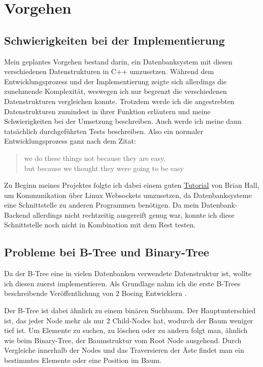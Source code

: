 \documentclass[11pt,a4paper]{article}
\begin{document}
\section{Vorgehen}

\subsection{Schwierigkeiten bei der Implementierung}

Mein geplantes Vorgehen bestand darin, ein Datenbanksystem mit diesen
verschiedenen Datenstrukturen in C++ umzusetzen.
Während dem Entwicklungsprozess und der Implementierung zeigte sich allerdings die
zunehmende Komplexität, weswegen ich nur begrenzt die verschiedenen Datenstrukturen
vergleichen konnte. Trotzdem werde ich die angestrebten Datenstrukturen
zumindest in ihrer Funktion erläutern und meine Schwierigkeiten bei der Umsetzung
beschreiben.
Auch werde ich meine dann tatsächlich durchgeführten Tests beschreiben.
Also ein normaler Entwicklungsprozess ganz nach dem Zitat:

\begin{quote}
    \guillemetright we do these things not because they are easy, \\
    \hspace*{0.2em} but because we thought they were going to be easy\guillemetleft
\end{quote}

Zu Beginn meines Projektes folgte ich dabei einem guten
\href{https://beej.us/guide/bgnet/html/}{Tutorial}
von Brian Hall, um Kommunikation über Linux Websockets umzusetzen, da Datenbanksysteme
eine Schnittstelle zu anderen Programmen benötigen.
Da mein Datenbank-Backend allerdings nicht rechtzeitig ausgereift genug war, konnte
ich diese Schnittstelle noch nicht in Kombination mit dem Rest testen.

\subsection{Probleme bei B-Tree und Binary-Tree}

Da der B-Tree eine in vielen Datenbanken verwendete Datenstruktur ist, wollte ich
diesen zuerst implementieren. Als Grundlage nahm ich die erste B-Trees beschreibende
Veröffentlichung von 2 Boeing Entwicklern \cite{boeing_engineers}.

\vspace*{0.3cm}

Der B-Tree ist dabei ähnlich zu einem binären Suchbaum.
Der Hauptunterschied ist, das jeder Node mehr als nur 2 Child-Nodes
hat, wodurch der Baum weniger tief ist.
Um Elemente zu suchen, zu löschen oder zu andern folgt man, ähnlich wie beim
Binary-Tree, der Baumstruktur vom Root Node ausgehend.
Durch Vergleiche innerhalb der Nodes und das Traversieren der
Äste findet man ein bestimmtes Elemente oder eine Position im Baum.
\end{document}
